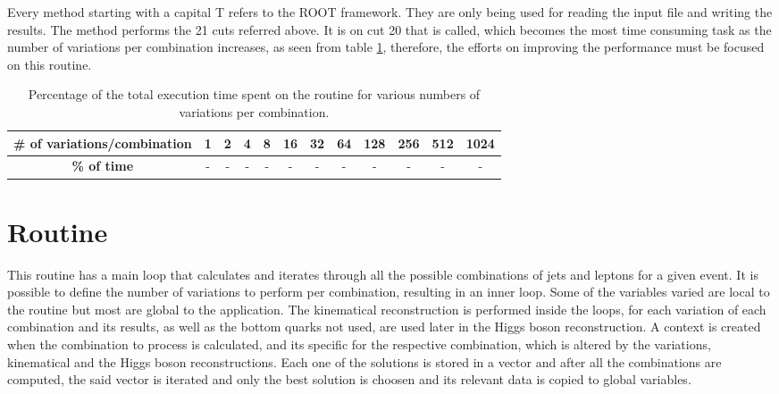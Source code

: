 Every method starting with a capital T refers to the ROOT framework. They are only being used for reading the input file and writing the results. The \ttDoCuts method performs the 21 cuts referred above. It is on cut 20 that \ttDilepKinFit is called, which becomes the most time consuming task as the number of variations per combination increases, as seen from table \ref{tab:TempoKinFit}, therefore, the efforts on improving the performance must be focused on this routine.

\begin{table}[!htp]
	\begin{center}
		\begin{tabular}{|c|c|c|c|c|c|c|c|c|c|c|c|}
			\hline
			\textbf{# of variations/combination} & 1 & 2 & 4 & 8 & 16 & 32 & 64 & 128 & 256 & 512 & 1024 \\ \hline
			\textbf{\% of time} & - & - & - & - & - & - & - & - & - & - & - \\ \hline
		\end{tabular}
		\caption{Percentage of the total execution time spent on the \ttDilepKinFit routine for various numbers of variations per combination.}
		\label{tab:TempoKinFit}
	\end{center}
\end{table}


\section{\ttDilepKinFit Routine}
\label{Application:ttDilepKinFit}

This routine has a main loop that calculates and iterates through all the possible combinations of jets and leptons for a given event. It is possible to define the number of variations to perform per combination, resulting in an inner loop. Some of the variables varied are local to the routine but most are global to the application. The kinematical reconstruction is performed inside the loops, for each variation of each combination and its results, as well as the bottom quarks not used, are used later in the Higgs boson reconstruction. A context is created when the combination to process is calculated, and its specific for the respective combination, which is altered by the variations, kinematical and the Higgs boson reconstructions. Each one of the solutions is stored in a vector and after all the combinations are computed, the said vector is iterated and only the best solution is choosen and its relevant data is copied to global variables.

